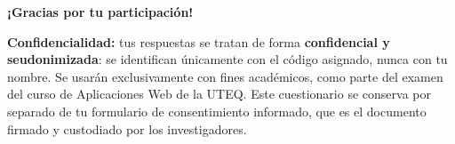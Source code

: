 \documentclass[11pt,a4paper]{article}
\begin{document}
\vspace{2.6mm}
\begin{center}
  {\fontsize{10.2}{12}\selectfont\bfseries\color{verdeOsc}%
   ¡Gracias por tu participaci\'on!\par}
\end{center}

\vspace{1.6mm}
\noindent
\begingroup
\setlength{\fboxsep}{0pt}
\colorbox{grisClaro}{%
  \begin{minipage}{\dimexpr\linewidth-16pt\relax}
    \vspace{1.3mm}
    \noindent{\color{verdeUTEQ}\rule{\linewidth}{1.6pt}}
    \vspace{1.8mm}
    \par\noindent
    {\fontsize{7.0}{8.7}\selectfont\color{gris}%
     \textbf{Confidencialidad:} tus respuestas se tratan de forma
     \textbf{confidencial y seudonimizada}: se identifican \'unicamente con el
     c\'odigo asignado, nunca con tu nombre. Se usar\'an exclusivamente con fines
     acad\'emicos, como parte del examen del curso de Aplicaciones Web de la UTEQ.
     Este cuestionario se conserva por separado de tu formulario de consentimiento
     informado, que es el documento firmado y custodiado por los investigadores.\par}
    \vspace{1.3mm}
  \end{minipage}}
\endgroup
\par
\end{document}
